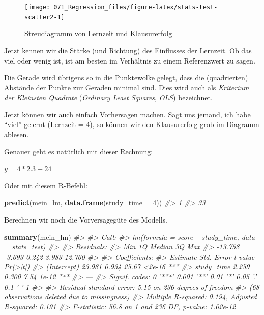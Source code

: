 \documentclass[12pt,ngerman,]{book}
\makeatletter
\newenvironment{Shaded}{\begin{snugshade}}{\end{snugshade}}
\newcommand{\KeywordTok}[1]{\textcolor[rgb]{0.13,0.29,0.53}{\textbf{{#1}}}}
\newcommand{\DataTypeTok}[1]{\textcolor[rgb]{0.13,0.29,0.53}{{#1}}}
\newcommand{\DecValTok}[1]{\textcolor[rgb]{0.00,0.00,0.81}{{#1}}}
\newcommand{\CommentTok}[1]{\textcolor[rgb]{0.56,0.35,0.01}{\textit{{#1}}}}
\newcommand{\NormalTok}[1]{{#1}}
\newenvironment{kframe}{%
\medskip{}
\setlength{\fboxsep}{.8em}
 \def\at@end@of@kframe{}%
 \ifinner\ifhmode%
  \def\at@end@of@kframe{\end{minipage}}%
  \begin{minipage}{\columnwidth}%
 \fi\fi%
 \def\FrameCommand##1{\hskip\@totalleftmargin \hskip-\fboxsep
 \colorbox{shadecolor}{##1}\hskip-\fboxsep
     \hskip-\linewidth \hskip-\@totalleftmargin \hskip\columnwidth}%
 \MakeFramed {\advance\hsize-\width
   \@totalleftmargin\z@ \linewidth\hsize
   \@setminipage}}%
 {\par\unskip\endMakeFramed%
 \at@end@of@kframe}
\renewenvironment{Shaded}{\begin{kframe}}{\end{kframe}}
\theoremstyle{definition}
\theoremstyle{definition}
\theoremstyle{remark}
\makeatother
\begin{document}
\begin{figure}

{\centering \texttt{[image: 071\_Regression\_files/figure-latex/stats-test-scatter2-1]} 

}

\caption{Streudiagramm von Lernzeit und Klausurerfolg}\label{fig:stats-test-scatter2}
\end{figure}

Jetzt kennen wir die Stärke (und Richtung) des Einflusses der Lernzeit.
Ob das viel oder wenig ist, ist am besten im Verhältnis zu einem
Referenzwert zu sagen.

Die Gerade wird übrigens so in die Punktewolke gelegt, dass die
(quadrierten) Abstände der Punkte zur Geraden minimal sind. Dies wird
auch als \emph{Kriterium der Kleinsten
Quadrate} (\emph{Ordinary Least
Squares}, \emph{OLS}) bezeichnet.

Jetzt können wir auch einfach Vorhersagen machen. Sagt uns jemand, ich
habe ``viel'' gelernt (Lernzeit = 4), so können wir den Klausurerfolg
grob im Diagramm ablesen.

Genauer geht es natürlich mit dieser Rechnung:

\(y = 4*2.3 + 24\)

Oder mit diesem R-Befehl:

\begin{Shaded}
\begin{Highlighting}[]
\KeywordTok{predict}\NormalTok{(mein_lm, }\KeywordTok{data.frame}\NormalTok{(}\DataTypeTok{study_time =} \DecValTok{4}\NormalTok{))}
\CommentTok{#>  1 }
\CommentTok{#> 33}
\end{Highlighting}
\end{Shaded}

Berechnen wir noch die Vorversagegüte des Modells.

\begin{Shaded}
\begin{Highlighting}[]
\KeywordTok{summary}\NormalTok{(mein_lm)}
\CommentTok{#> }
\CommentTok{#> Call:}
\CommentTok{#> lm(formula = score ~ study_time, data = stats_test)}
\CommentTok{#> }
\CommentTok{#> Residuals:}
\CommentTok{#>     Min      1Q  Median      3Q     Max }
\CommentTok{#> -13.758  -3.693   0.242   3.983  12.760 }
\CommentTok{#> }
\CommentTok{#> Coefficients:}
\CommentTok{#>             Estimate Std. Error t value Pr(>|t|)    }
\CommentTok{#> (Intercept)   23.981      0.934   25.67   <2e-16 ***}
\CommentTok{#> study_time     2.259      0.300    7.54    1e-12 ***}
\CommentTok{#> ---}
\CommentTok{#> Signif. codes:  0 '***' 0.001 '**' 0.01 '*' 0.05 '.' 0.1 ' ' 1}
\CommentTok{#> }
\CommentTok{#> Residual standard error: 5.15 on 236 degrees of freedom}
\CommentTok{#>   (68 observations deleted due to missingness)}
\CommentTok{#> Multiple R-squared:  0.194,  Adjusted R-squared:  0.191 }
\CommentTok{#> F-statistic: 56.8 on 1 and 236 DF,  p-value: 1.02e-12}
\end{Highlighting}
\end{Shaded}
\end{document}
